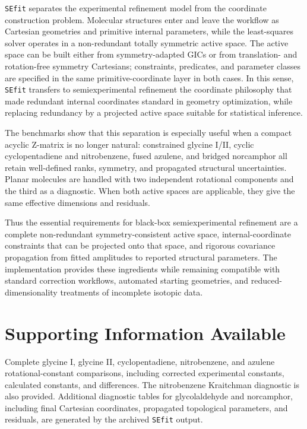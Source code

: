 \documentclass[journal=jctcce,manuscript=article,maxauthors=999]{achemso}
\begin{document}
\texttt{SEfit} separates the experimental refinement model from the coordinate
construction problem. Molecular structures enter and leave the workflow as
Cartesian geometries and primitive internal parameters, while the least-squares
solver operates in a non-redundant totally symmetric active space. The active
space can be built either from symmetry-adapted GICs or from
translation- and rotation-free symmetry Cartesians; constraints, predicates,
and parameter classes are specified in the same primitive-coordinate layer in
both cases.
In this sense, \texttt{SEfit} transfers to semiexperimental refinement the
coordinate philosophy that made redundant internal coordinates standard in
geometry optimization, while replacing redundancy by a projected active space
suitable for statistical inference.

The benchmarks show that this separation is especially useful when a compact
acyclic Z-matrix is no longer natural: constrained glycine I/II, cyclic
cyclopentadiene and nitrobenzene, fused azulene, and bridged norcamphor all
retain well-defined ranks, symmetry, and propagated structural uncertainties.
Planar molecules are handled with two independent rotational components and
the third as a diagnostic. When both active spaces are applicable, they give
the same effective dimensions and residuals.

Thus the essential requirements for black-box semiexperimental refinement are
a complete non-redundant symmetry-consistent active space, internal-coordinate
constraints that can be projected onto that space, and rigorous covariance
propagation from fitted amplitudes to reported structural parameters. The
implementation provides these ingredients while remaining compatible with
standard correction workflows, automated starting geometries, and
reduced-dimensionality treatments of incomplete isotopic data.

\section*{Supporting Information Available}

Complete glycine I, glycine II, cyclopentadiene, nitrobenzene, and azulene
rotational-constant comparisons, including corrected experimental constants,
calculated constants, and differences. The nitrobenzene Kraitchman diagnostic
is also provided. Additional diagnostic tables for glycolaldehyde and norcamphor, including
final Cartesian coordinates, propagated topological parameters, and residuals,
are generated by the archived \texttt{SEfit} output.



\end{document}
